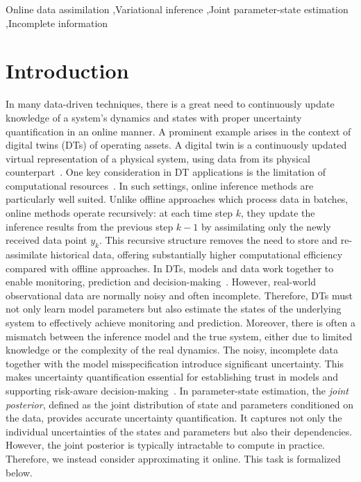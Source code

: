 \documentclass[preprint,3p,times]{elsarticle}
\begin{document}
\begin{frontmatter}
\begin{keyword}
Online data assimilation \sep Variational inference \sep Joint parameter-state estimation \sep Incomplete information
\end{keyword}

\end{frontmatter}

\section{Introduction}
\label{sec:introduction}
In many data-driven techniques, there is a great need to continuously update knowledge of a system’s dynamics and states with proper uncertainty quantification in an online manner. A prominent example arises in the context of digital twins (DTs) of operating assets. A digital twin is a continuously updated virtual representation of a physical system, using data from its physical counterpart~\cite{XiuTartakovsky2025DigitalTwins}. One key consideration in DT applications is the limitation of computational resources~\cite{dt_gap}. In such settings, online inference methods are particularly well suited. Unlike offline approaches which process data in batches, online methods operate recursively: at each time step $k$, they update the inference results from the previous step $k-1$ by assimilating only the newly received data point $y_k$. This recursive structure removes the need to store and re-assimilate historical data, offering substantially higher computational efficiency compared with offline approaches. In DTs, models and data work together to enable monitoring, prediction and decision-making~\cite{dt_gap}.
However, real-world observational data are normally noisy and often incomplete. Therefore, DTs must not only learn model parameters but also estimate the states of the underlying system to effectively achieve monitoring and prediction. Moreover, there is often a mismatch between the inference model and the true system, either due to limited knowledge or the complexity of the real dynamics. The noisy, incomplete data together with the model misspecification introduce significant uncertainty. This makes uncertainty quantification essential for establishing trust in models and supporting risk-aware decision-making~\cite{pash2025predictive, dt_gap}. In parameter-state estimation, the \textit{joint posterior}, defined as the joint distribution of state and parameters conditioned on the data, provides accurate uncertainty quantification. It captures not only the individual uncertainties of the states and parameters but also their dependencies. However, the joint posterior is typically intractable to compute in practice. Therefore, we instead consider approximating it online. This task is formalized below.
\end{document}
